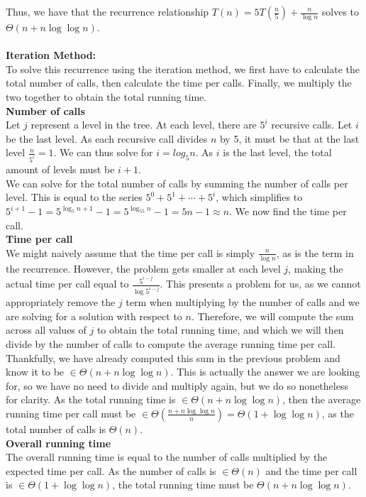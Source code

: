 \documentclass{article}
\begin{document}
\begin{enumerate}
\begin{enumerate}
Thus, we have that the recurrence relationship $T(n)=5T(\frac{n}{5})+\frac{n}{\log n}$ solves to $\Theta(n+n\log \log n)$.
\\ \\ \textbf{Iteration Method:}
\\ To solve this recurrence using the iteration method, we first have to calculate the total number of calls, then calculate the time per calls. Finally, we multiply the two together to obtain the total running time.
\\ \textbf{Number of calls}
\\ Let $j$ represent a level in the tree. At each level, there are $5^i$ recursive calls. Let $i$ be the last level. As each recursive call divides $n$ by 5, it must be that at the last level $\frac{n}{5^i}=1$. We can thus solve for $i=log_5n$. As $i$ is the last level, the total amount of levels must be $i+1$. 
\\ We can solve for the total number of calls by summing the number of calls per level. This is equal to the series $5^0+5^1+\cdots+ 5^i$, which simplifies to $5^{i+1}-1=5^{\log_5n+1}-1= 5^{\log_55n}-1= 5n-1\approx n$. We now find the time per call.
\\ \textbf{Time per call}
\\ We might naively assume that the time per call is simply $\frac{n}{\log n}$, as is the term in the recurrence. However, the problem gets smaller at each level $j$, making the actual time per call equal to $\frac{5^{i-j}}{\log 5^{i-j}}$. This presents a problem for us, as we cannot appropriately remove the $j$ term when multiplying by the number of calls and we are solving for a solution with respect to $n$. Therefore, we will compute the sum across all values of $j$ to obtain the total running time, and which we will then divide by the number of calls to compute the average running time per call. Thankfully, we have already computed this sum in the previous problem and know it to be $\in \Theta(n+n\log \log n)$. This is actually the answer we are looking for, so we have no need to divide and multiply again, but we do so nonetheless for clarity. As the total running time is $\in \Theta(n+n\log \log n)$, then the average running time per call must be $\in \Theta(\frac{n+n\log \log n}{n})=\Theta(1+\log \log n)$, as the total number of calls is $\Theta(n)$.
\\ \textbf{Overall running time}
\\ The overall running time is equal to the number of calls multiplied by the expected time per call. As the number of calls is $\in \Theta(n)$ and the time per call is $\in \Theta(1+\log \log n)$, the total running time must be $\Theta(n+n\log \log n)$.

\end{enumerate}
\end{enumerate}
\end{document}

